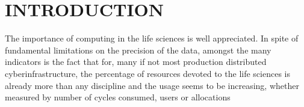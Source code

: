 \documentclass[]{svjour3}
\begin{document}
\newif\ifdraft
\ifdraft
 \newcommand{\jkimnote}[1]{{\textcolor{green}   { ***Joohyun:   #1 }}}
 \newcommand{\jhanote}[1]{  {\textcolor{red}     { ***SJ: #1 }}}
  \newcommand{\smnote}[1]{  {\textcolor{red}     { ***Sharath: #1 }}}
 \newcommand{\todo}[1]{  {\textcolor{red}     { ***TODO: #1 }}}
 \newcommand{\fix}[1]{  {\textcolor{red}     { ***FIX: #1 }}}
\newcommand{\yyenote}[1]{  {\textcolor{blue}     { ***YYE: #1 }}}
 \newcommand{\reviewer}[1]{}
\else
 \newcommand{\reviewer}[1]{}
 \newcommand{\yyenote}[1]{}
 \newcommand{\jkimnote}[1]{}
 \newcommand{\smnote}[1]{}
 \newcommand{\jhanote}[1]{}
 \newcommand{\todo}[1]{  {\textcolor{red}     { ***TODO: #1 }}}
 \newcommand{\fix}[1]{}                                                                              
 \fi






\section{INTRODUCTION}



The importance of computing in the life sciences is well appreciated.
In spite of fundamental limitations on the precision of the data,
amongst the many indicators is the fact that for, many if not most
production distributed cyberinfrastructure, the percentage of
resources devoted to the life sciences is already more than any
discipline and the usage seems to be increasing, whether measured by
number of cycles consumed, users or allocations
\end{document}
